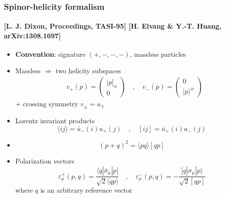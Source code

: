 \documentclass[english]{beamer}
\begin{document}
\begin{frame}[shrink=20]
\frametitle{Spinor-helicity formalism}
\framesubtitle{\tiny\color{blue}[L. J. Dixon, Proceedings, TASI-95]
[H. Elvang \& Y.-T. Huang, arXiv:1308.1697]
\color{black}\normalsize}
\begin{itemize}
\item<1-> \textbf{Convention}: signature $(+,-,-,-)$, massless particles


\item<2-> Massless $\Rightarrow$ two helicity subspaces
\begin{equation*}
\begin{split}
& v_+(p) = \begin{pmatrix}
|p]_\alpha \\ 0
\end{pmatrix} %
\quad,\quad
v_-(p) = \begin{pmatrix}
0 \\ |p\rangle^{\dot{\alpha}}
\end{pmatrix} %
\end{split}
\end{equation*} 
$+$ crossing symmetry $v_{\pm} = u_{\mp}$

\item<3-> Lorentz invariant products
\begin{equation*}
 \langle ij \rangle = \bar{u}_-(i)u_+(j) 
\quad,\quad
 [ij] = \bar{u}_+(i)u_-(j)
\end{equation*}

\item<4-> []
\begin{equation*}
(p+q)^2 = \langle p q\rangle[qp]
\end{equation*}

\item<5-> Polarization vectors
\begin{equation*}
\varepsilon^+_\mu (p, q) = \frac{\langle q | \bar{\sigma}_\mu |p]}{\sqrt{2}\langle qp \rangle}
\quad,\quad
\varepsilon^-_\mu (p, q) = -\frac{[q|\sigma_\mu | p\rangle}{\sqrt{2}[qp]}
\end{equation*}
where $q$ is an arbitrary reference vector
\end{itemize}

\end{frame}
\end{document}
